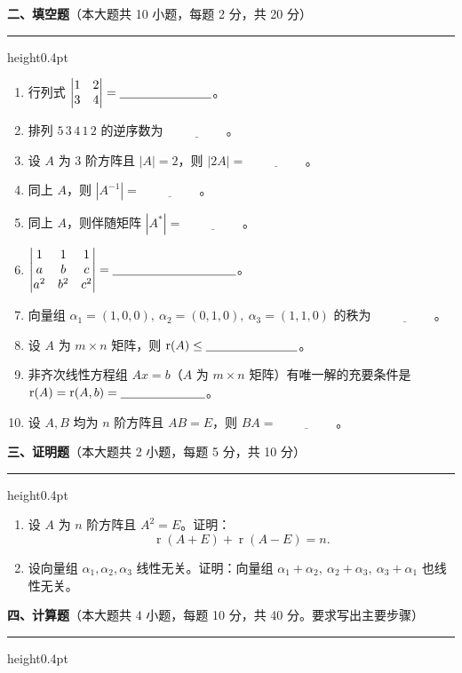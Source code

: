 \documentclass[12pt]{ctexart}
\newcommand{\bigsection}[2]{%
  \vspace{6pt}%
  {\noindent\bfseries\large #1}\hfill{\normalsize（本大题共 #2）}\par
  \vspace{2pt}\hrule height0.4pt\vspace{8pt}}
\newcommand{\blank}[1][2.6cm]{\underline{\hspace{#1}}}
\newcommand{\rank}{\operatorname{r}}
\begin{document}
\bigsection{二、填空题}{10 小题，每题 2 分，共 20 分}

\begin{enumerate}[label=\arabic*.]
\item 行列式 $\begin{vmatrix}1&2\\3&4\end{vmatrix}=\blank$。
\item 排列 $5\,3\,4\,1\,2$ 的逆序数为 $\blank[2cm]$。
\item 设 $A$ 为 $3$ 阶方阵且 $|A|=2$，则 $|2A|=\blank[2cm]$。
\item 同上 $A$，则 $|A^{-1}|=\blank[2cm]$。
\item 同上 $A$，则伴随矩阵 $|A^{*}|=\blank[2cm]$。
\item $\begin{vmatrix}1&1&1\\ a&b&c\\ a^{2}&b^{2}&c^{2}\end{vmatrix}=\blank[3.5cm]$。
\item 向量组 $\alpha_1=(1,0,0),\ \alpha_2=(0,1,0),\ \alpha_3=(1,1,0)$ 的秩为 $\blank[2cm]$。
\item 设 $A$ 为 $m\times n$ 矩阵，则 $\rank(A)\leq\blank[2.6cm]$。
\item 非齐次线性方程组 $Ax=b$（$A$ 为 $m\times n$ 矩阵）有唯一解的充要条件是
  $\rank(A)=\rank(A,b)=\blank[2.4cm]$。
\item 设 $A,B$ 均为 $n$ 阶方阵且 $AB=E$，则 $BA=\blank[2cm]$。
\end{enumerate}

\bigsection{三、证明题}{2 小题，每题 5 分，共 10 分}

\begin{enumerate}[label=\arabic*.]
\item 设 $A$ 为 $n$ 阶方阵且 $A^{2}=E$。证明：
  \[
  \rank(A+E)+\rank(A-E)=n .
  \]

\item 设向量组 $\alpha_1,\alpha_2,\alpha_3$ 线性无关。证明：向量组
  $\alpha_1+\alpha_2,\ \alpha_2+\alpha_3,\ \alpha_3+\alpha_1$ 也线性无关。
\end{enumerate}

\bigsection{四、计算题}{4 小题，每题 10 分，共 40 分。要求写出主要步骤}
\end{document}
